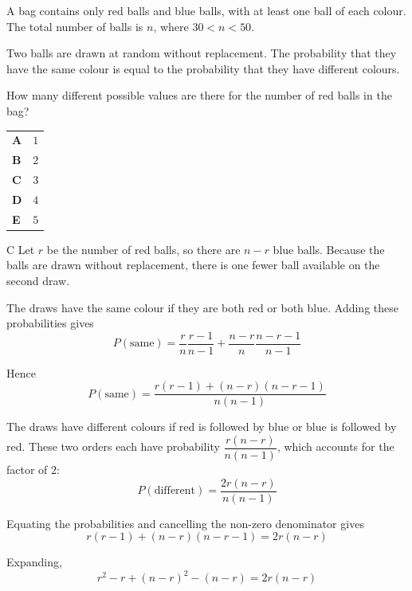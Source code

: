 \documentclass[11pt,a4paper]{article}
\begin{document}
\begin{enumerate}[label=\textbf{\arabic*.},leftmargin=*,itemsep=0pt,start=13]
A bag contains only red balls and blue balls, with at least one ball of each colour. The total number of balls is $n$, where $30<n<50$.

Two balls are drawn at random without replacement. 
The probability that they have the same colour is equal to the probability that they have different colours.

How many different possible values are there for the number of red balls in the bag?

\par\vspace*{12pt}
\begin{tabularx}{\linewidth}{@{}>{\bfseries}l Y@{}}
A &
$1$
\\[0.8em]
B &
$2$
\\[0.8em]
C &
$3$
\\[0.8em]
D &
$4$
\\[0.8em]
E &
$5$
\\
\end{tabularx}

\begin{djsSolution}{C}
Let $r$ be the number of red balls, so there are $n-r$ blue balls. Because the balls are drawn without replacement, there is one fewer ball available on the second draw.

The draws have the same colour if they are both red or both blue. Adding these probabilities gives
\[
P(\text{same})=\frac{r}{n}\frac{r-1}{n-1}+\frac{n-r}{n}\frac{n-r-1}{n-1}
\]

Hence
\[
P(\text{same})=\frac{r(r-1)+(n-r)(n-r-1)}{n(n-1)}
\]

The draws have different colours if red is followed by blue or blue is followed by red. These two orders each have probability $\dfrac{r(n-r)}{n(n-1)}$, which accounts for the factor of $2$:
\[
P(\text{different})=\frac{2r(n-r)}{n(n-1)}
\]

Equating the probabilities and cancelling the non-zero denominator gives
\[
r(r-1)+(n-r)(n-r-1)=2r(n-r)
\]

Expanding,
\[
r^2-r+(n-r)^2-(n-r)=2r(n-r)
\]


\end{djsSolution}
\end{enumerate}
\end{document}
